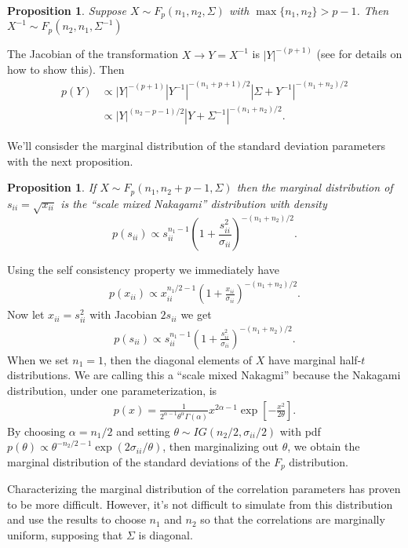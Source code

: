 \documentclass{article}\usepackage[]{graphicx}\usepackage[]{color}
\newtheorem{prop}[thm]{Proposition}
\begin{document}
\begin{prop}\label{prop:invF}
Suppose $X\sim F_p(n_1, n_2, \Sigma)$ with $\max\{n_1,n_2\}>p-1$. Then $X^{-1}\sim F_p(n_2, n_1, \Sigma^{-1})$
\end{prop}
The Jacobian of the transformation $X\to Y=X^{-1}$ is $|Y|^{-(p+1)}$ (see \cite{mathai1997jacobians} for details on how to show this). Then 
\begin{align*}
  p(Y) &\propto |Y|^{-(p+1)}|Y^{-1}|^{-(n_1 + p + 1)/2}|\Sigma + Y^{-1}|^{-(n_1 + n_2)/2}\\
  &\propto |Y|^{(n_2 - p - 1)/2}|Y + \Sigma^{-1}|^{-(n_1 + n_2)/2}.
\end{align*}

We'll consisder the marginal distribution of the standard deviation parameters with the next proposition.
\begin{prop}\label{prop:sd}
 If $X\sim F_p(n_1, n_2 + p - 1, \Sigma)$ then the marginal distribution of $s_{ii}=\sqrt{x_{ii}}$ is the ``scale mixed Nakagami'' distribution with density
  \[
    p(s_{ii})\propto s_{ii}^{n_1 - 1}\left(1 + \frac{s_{ii}^2}{\sigma_{ii}}\right)^{-(n_1 + n_2)/2}.
  \]
\end{prop}
Using the self consistency property we immediately have
\begin{align*}
  p(x_{ii})\propto x_{ii}^{n_1/2 - 1}\left(1 + \frac{x_{ii}}{\sigma_{ii}}\right)^{-(n_1 + n_2)/2}.
\end{align*}
Now let $x_{ii}=s_{ii}^2$ with Jacobian $2s_{ii}$ we get
\begin{align*}
  p(s_{ii})\propto s_{ii}^{n_1 - 1}\left(1 + \frac{s_{ii}^2}{\sigma_{ii}}\right)^{-(n_1 + n_2)/2}.
\end{align*}
When we set $n_1=1$, then the diagonal elements of $X$ have marginal half-$t$ distributions. We are calling this a ``scale mixed Nakagmi'' because the Nakagami distribution, under one parameterization, is
\begin{align*}
  p(x) = \frac{1}{2^{\alpha - 1}\theta^\alpha \Gamma(\alpha)}x^{2\alpha -1}\exp\left[-\frac{x^2}{2\theta}\right].
\end{align*}
By choosing $\alpha=n_1/2$ and setting $\theta \sim IG(n_2/2, \sigma_{ii}/2)$ with pdf $p(\theta) \propto \theta^{-n_2/2 - 1}\exp(2\sigma_{ii}/\theta)$, then marginalizing out $\theta$, we obtain the marginal distribution of the standard deviations of the $F_p$ distribution.

Characterizing the marginal distribution of the correlation parameters has proven to be more difficult. However, it's not difficult to simulate from this distribution and use the results to choose $n_1$ and $n_2$ so that the correlations are marginally uniform, supposing that $\Sigma$ is diagonal. 
\end{document}
